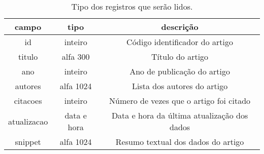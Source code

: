 \begin{table}[htbp]
  \centering
    \begin{tabular}{|c|c|c|}
    \toprule
    \rowcolor[rgb]{ .816,  .808,  .808} \textbf{campo} & \textbf{tipo} & \textbf{descrição} \\
    \midrule
    id    & inteiro & Código identificador do artigo \\
    \midrule
    titulo & alfa 300 & Título do artigo \\
    \midrule
    ano   & inteiro & Ano de publicação do artigo \\
    \midrule
    autores & alfa 1024 & Lista dos autores do artigo \\
    \midrule
    citacoes & inteiro & Número de vezes que o artigo foi citado \\
    \midrule
    atualizacao & data e hora & Data e hora da última atualização dos dados \\
    \midrule
    snippet & alfa 1024 & Resumo textual dos dados do artigo \\
    \bottomrule
    \end{tabular}%
  \caption{Tipo dos registros que serão lidos.}
  \label{tab:tipo_registro}%
\end{table}%